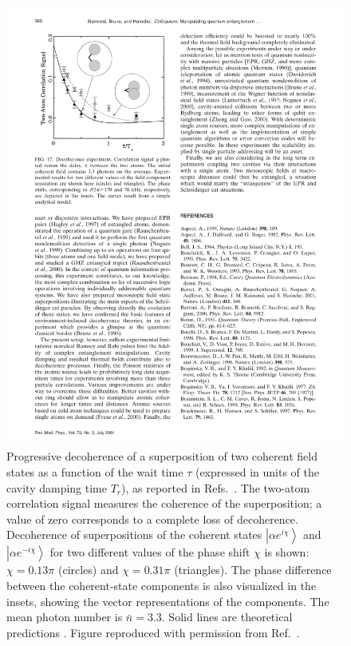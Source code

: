 \documentclass[3p,sort&compress]{elsarticle}
\newcommand{\ket}[1]{\left\vert{#1}\right\rangle}
\newcommand{\E}{\ensuremath{e}}
\newcommand{\I}{\ensuremath{i}}
\begin{document}
\begin{figure}
\centering
\includegraphics[scale=.7]{twoatomcorr.pdf}
\caption{Progressive decoherence of a superposition of two coherent field states as a function of the wait time $\tau$ (expressed in units of the cavity damping time $T_r$), as reported in Refs.~\cite{Brune:1996:om,Maitre:1997:tv}. The two-atom correlation signal measures the coherence of the superposition; a value of zero corresponds to a complete loss of decoherence. Decoherence of superpositions of the coherent states $\ket{\alpha \E^{\I \chi}}$ and $\ket{\alpha \E^{-\I \chi}}$ for two different values of the phase shift $\chi$ is shown: $\chi=0.13\pi$ (circles) and $\chi=0.31\pi$ (triangles). The phase difference between the coherent-state components is also visualized in the insets, showing the vector representations of the components. The mean photon number is $\bar{n}=3.3$. Solid lines are theoretical predictions \cite{Davidovich:1996:sa,Maitre:1997:tv}.  Figure reproduced with permission from Ref.~\cite{Raimond:2001:aa}.}
\label{fig:twoatom}
\end{figure}
\end{document}

